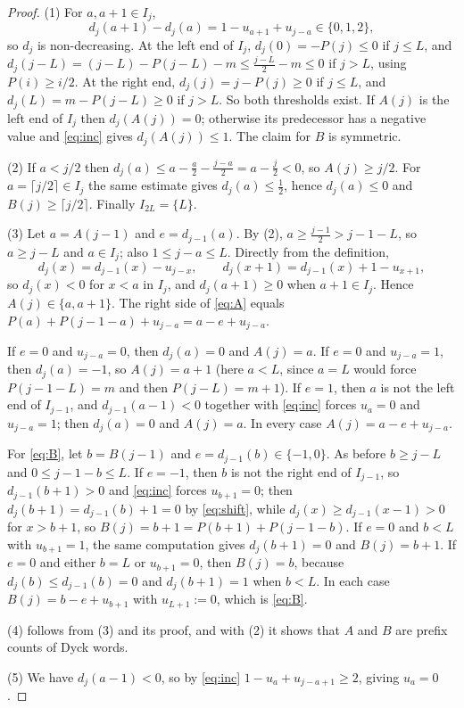 \documentclass[11pt]{amsart}
\theoremstyle{definition}
\theoremstyle{remark}
\numberwithin{equation}{section}
\begin{document}
\begin{proof}
(1) For $a,a+1\in I_j$,
\begin{equation}\label{eq:inc}
d_j(a+1)-d_j(a)=1-u_{a+1}+u_{j-a}\in\{0,1,2\},
\end{equation}
so $d_j$ is non-decreasing. At the left end of $I_j$, $d_j(0)=-P(j)\le0$ if $j\le L$, and $d_j(j-L)=(j-L)-P(j-L)-m\le\frac{j-L}{2}-m\le0$ if $j>L$, using $P(i)\ge i/2$. At the right end, $d_j(j)=j-P(j)\ge0$ if $j\le L$, and $d_j(L)=m-P(j-L)\ge0$ if $j>L$. So both thresholds exist. If $A(j)$ is the left end of $I_j$ then $d_j(A(j))=0$; otherwise its predecessor has a negative value and \eqref{eq:inc} gives $d_j(A(j))\le1$. The claim for $B$ is symmetric.

(2) If $a<j/2$ then $d_j(a)\le a-\frac a2-\frac{j-a}2=a-\frac j2<0$, so $A(j)\ge j/2$. For $a=\lceil j/2\rceil\in I_j$ the same estimate gives $d_j(a)\le\frac12$, hence $d_j(a)\le0$ and $B(j)\ge\lceil j/2\rceil$. Finally $I_{2L}=\{L\}$.

(3) Let $a=A(j-1)$ and $e=d_{j-1}(a)$. By (2), $a\ge\frac{j-1}2>j-1-L$, so $a\ge j-L$ and $a\in I_j$; also $1\le j-a\le L$. Directly from the definition,
\begin{equation}\label{eq:shift}
d_j(x)=d_{j-1}(x)-u_{j-x},\qquad d_j(x+1)=d_{j-1}(x)+1-u_{x+1},
\end{equation}
so $d_j(x)<0$ for $x<a$ in $I_j$, and $d_j(a+1)\ge0$ when $a+1\in I_j$. Hence $A(j)\in\{a,a+1\}$. The right side of \eqref{eq:A} equals $P(a)+P(j-1-a)+u_{j-a}=a-e+u_{j-a}$.

If $e=0$ and $u_{j-a}=0$, then $d_j(a)=0$ and $A(j)=a$. If $e=0$ and $u_{j-a}=1$, then $d_j(a)=-1$, so $A(j)=a+1$ (here $a<L$, since $a=L$ would force $P(j-1-L)=m$ and then $P(j-L)=m+1$). If $e=1$, then $a$ is not the left end of $I_{j-1}$, and $d_{j-1}(a-1)<0$ together with \eqref{eq:inc} forces $u_a=0$ and $u_{j-a}=1$; then $d_j(a)=0$ and $A(j)=a$. In every case $A(j)=a-e+u_{j-a}$.

For \eqref{eq:B}, let $b=B(j-1)$ and $e=d_{j-1}(b)\in\{-1,0\}$. As before $b\ge j-L$ and $0\le j-1-b\le L$. If $e=-1$, then $b$ is not the right end of $I_{j-1}$, so $d_{j-1}(b+1)>0$ and \eqref{eq:inc} forces $u_{b+1}=0$; then $d_j(b+1)=d_{j-1}(b)+1=0$ by \eqref{eq:shift}, while $d_j(x)\ge d_{j-1}(x-1)>0$ for $x>b+1$, so $B(j)=b+1=P(b+1)+P(j-1-b)$. If $e=0$ and $b<L$ with $u_{b+1}=1$, the same computation gives $d_j(b+1)=0$ and $B(j)=b+1$. If $e=0$ and either $b=L$ or $u_{b+1}=0$, then $B(j)=b$, because $d_j(b)\le d_{j-1}(b)=0$ and $d_j(b+1)=1$ when $b<L$. In each case $B(j)=b-e+u_{b+1}$ with $u_{L+1}:=0$, which is \eqref{eq:B}.

(4) follows from (3) and its proof, and with (2) it shows that $A$ and $B$ are prefix counts of Dyck words.

(5) We have $d_j(a-1)<0$, so by \eqref{eq:inc} $1-u_a+u_{j-a+1}\ge2$, giving $u_a=0$.
\end{proof}
\end{document}
